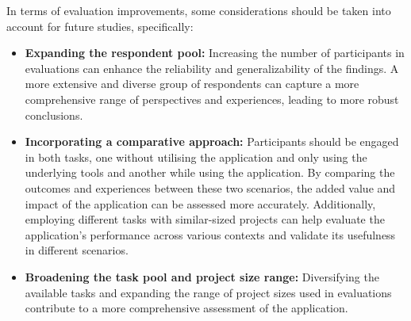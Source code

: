 In terms of evaluation improvements, some considerations should be taken into
account for future studies, specifically:

\begin{itemize}
  \item \textbf{Expanding the respondent pool:} Increasing the number of
    participants in evaluations can enhance the reliability and
    generalizability of the findings. A more extensive and diverse group of
    respondents can capture a more comprehensive range of perspectives and
    experiences, leading to more robust conclusions.
  \item \textbf{Incorporating a comparative approach:} Participants should be
    engaged in both tasks, one without utilising the application and only using
    the underlying tools and another while using the application. By comparing
    the outcomes and experiences between these two scenarios, the added value
    and impact of the application can be assessed more accurately.
    Additionally, employing different tasks with similar-sized projects can
    help evaluate the application's performance across various contexts and
    validate its usefulness in different scenarios.
  \item \textbf{Broadening the task pool and project size range:} Diversifying
    the available tasks and expanding the range of project sizes used in
    evaluations contribute to a more comprehensive assessment of the
    application.
\end{itemize}
